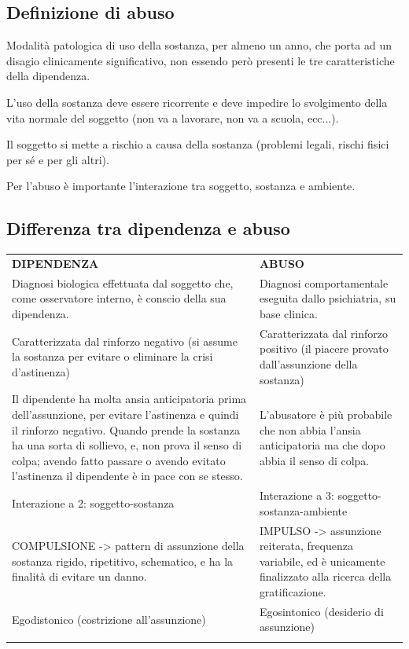 \subsection{Definizione di abuso}

Modalità patologica di uso della sostanza, per almeno un anno, che porta
ad un disagio clinicamente significativo, non essendo però presenti le
tre caratteristiche della dipendenza.

L'uso della sostanza deve essere ricorrente e deve impedire lo
svolgimento della vita normale del soggetto (non va a lavorare, non va a
scuola, ecc...).

Il soggetto si mette a rischio a causa della sostanza (problemi legali,
rischi fisici per sé e per gli altri).

Per l'abuso è importante l'interazione tra soggetto, sostanza e
ambiente.

\subsection{Differenza tra dipendenza e abuso}

\begin{table}
\begin{tabular}{p{}p{}}
\hline\noalign{\smallskip}
\textbf{DIPENDENZA} & \textbf{ABUSO} \\
\noalign{\smallskip}\svhline\noalign{\smallskip}

Diagnosi biologica effettuata dal soggetto che, come osservatore
interno, è conscio della sua dipendenza. & Diagnosi comportamentale eseguita dallo psichiatria, su base clinica.\\
Caratterizzata dal rinforzo negativo (si assume la sostanza per evitare o eliminare la crisi d'astinenza) & Caratterizzata dal rinforzo positivo
(il piacere provato dall'assunzione della sostanza) \\
Il dipendente ha molta ansia anticipatoria prima dell'assunzione, per evitare l'astinenza e quindi il rinforzo negativo. Quando prende la sostanza ha una sorta di sollievo, e, non prova il senso di colpa; avendo fatto passare o avendo evitato l'astinenza il dipendente è in pace con se stesso. & L'abusatore è più probabile che non abbia l'ansia anticipatoria ma che dopo abbia il senso di colpa.\\
Interazione a 2: soggetto-sostanza & Interazione a 3: soggetto-sostanza-ambiente\\
COMPULSIONE -> pattern di assunzione della sostanza rigido, ripetitivo, schematico, e ha la finalità di evitare un danno. & IMPULSO -> assunzione reiterata, frequenza variabile, ed è unicamente finalizzato alla ricerca della gratificazione.\\
Egodistonico (costrizione all'assunzione) & Egosintonico (desiderio di assunzione)\\
\noalign{\smallskip}\hline\noalign{\smallskip}
\end{tabular}
\end{table}

